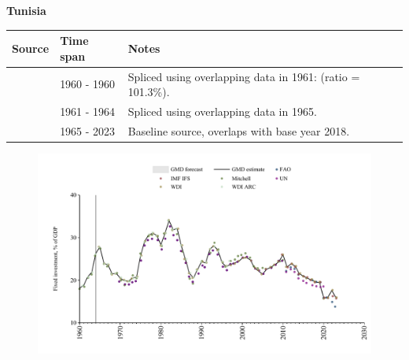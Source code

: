 \documentclass[12pt,a4paper,landscape]{article}
\begin{document}
\begin{adjustbox}{max totalsize={\paperwidth}{\paperheight},center}
\begin{minipage}[t][\textheight][t]{\textwidth}
\vspace*{0.5cm}
{}
\begin{center}
{\Large\bfseries Tunisia}
\end{center}
\vspace{0.5cm}
\begin{table}[H]
\centering
\small
\begin{tabular}{|l|l|l|}
\hline
\textbf{Source} & \textbf{Time span} & \textbf{Notes} \\
\hline
\rowcolor{white}\cite{Mitchell}& 1960 - 1960 &Spliced using overlapping data in 1961: (ratio = 101.3\%).\\
\rowcolor{lightgray}\cite{WDI_ARC}& 1961 - 1964 &Spliced using overlapping data in 1965.\\
\rowcolor{white}\cite{WDI}& 1965 - 2023 &Baseline source, overlaps with base year 2018.\\
\hline
\end{tabular}
\end{table}
\begin{figure}[H]
\centering
\includegraphics[width=\textwidth,height=0.6\textheight,keepaspectratio]{graphs/TUN_finv_GDP.pdf}
\end{figure}
\end{minipage}
\end{adjustbox}
\end{document}
